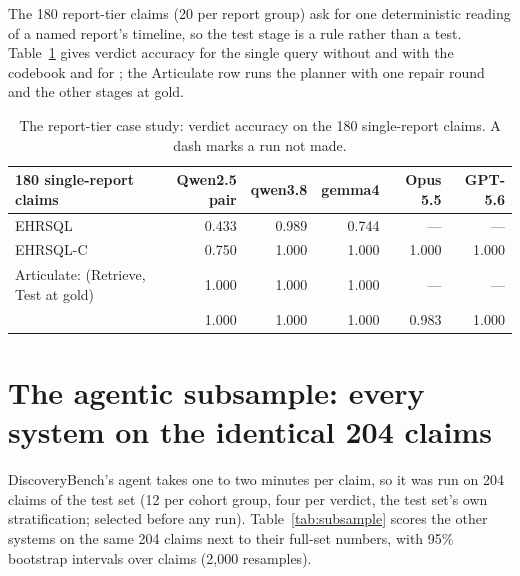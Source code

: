 The 180 report-tier claims (20 per report group) ask for one deterministic
reading of a named report's timeline, so the test stage is a rule rather
than a test. Table~\ref{tab:report} gives verdict accuracy for the single
query without and with the codebook and for \art{}; the Articulate row runs
the planner with one repair round and the other stages at gold.

\begin{table}[htbp]
\centering
\scriptsize
\setlength{\tabcolsep}{3pt}
\begin{tabular}{@{}lrrrrr@{}}
\toprule
180 single-report claims & Qwen2.5 pair & qwen3.8 & gemma4 & Opus 5.5 & GPT-5.6 \\
\midrule
EHRSQL & 0.433 & 0.989 & 0.744 & --- & --- \\
EHRSQL-C & 0.750 & 1.000 & 1.000 & 1.000 & 1.000 \\
Articulate: \art{} (Retrieve, Test at gold) & 1.000 & 1.000 & 1.000 & --- & --- \\
\art{} & 1.000 & 1.000 & 1.000 & 0.983 & 1.000 \\
\bottomrule
\end{tabular}
\caption{The report-tier case study: verdict accuracy on the 180
single-report claims. A dash marks a run not made.}
\label{tab:report}
\end{table}

\section{The agentic subsample: every system on the identical 204 claims}
\label{app:subsample}

DiscoveryBench's agent takes one to two minutes per claim, so it was run on
204 claims of the test set (12 per cohort group, four per verdict, the test
set's own stratification; selected before any run). Table~\ref{tab:subsample}
scores the other systems on the same 204 claims next to their full-set
numbers, with 95\% bootstrap intervals over claims (2{,}000 resamples).

